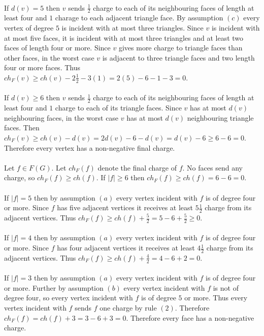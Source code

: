 \documentclass[letterpaper,12pt,oneside,onecolumn]{report}
\begin{document}
\paragraph{}
If $d(v) = 5$ then $v$ sends $\frac{1}{2}$ charge to each of its neighbouring faces of length at least four and $1$ charage to each adjacent triangle face. By assumption $(c)$ every vertex of degree $5$ is incident with at most three triangles. Since $v$ is incident with at most five faces, it is incident with at most three triangles and at least two faces of length four or more. Since $v$ gives more charge to triangle faces than other faces, in the worst case $v$ is adjacent to three triangle faces and two length four or more faces. Thus $ch_F(v) \geq ch(v) - 2\frac{1}{2} - 3(1) = 2(5) - 6 -1 - 3 = 0$.
\paragraph{}
If $d(v) \geq 6$ then $v$ sends $\frac{1}{2}$ charge to each of its neighbouring faces of length at least four and $1$ charge to each of its triangle faces. Since $v$ has at most $d(v)$ neighbouring faces, in the worst case $v$ has at most $d(v)$ neighbouring triangle faces. Then $ch_F(v) \geq ch(v) - d(v) = 2d(v) - 6 - d(v) = d(v) - 6 \geq 6 - 6 = 0$. Therefore every vertex has a non-negative final charge.
\paragraph{}
Let $f \in F(G)$. Let $ch_F(f)$ denote the final charge of $f$. No faces send any charge, so $ch_F(f) \geq ch(f)$. If $|f| \geq 6$ then $ch_F(f) \geq ch(f) = 6 -6 =0$.
\paragraph{}
If $|f| = 5$ then by assumption $(a)$ every vertex incident with $f$ is of degree four or more. Since $f$ has five adjacent vertices it receives at least $5\frac{1}{2}$ charge from its adjacent vertices. Thus $ch_F(f) \geq ch(f) + \frac{5}{2} = 5 - 6 + \frac{5}{2} \geq 0$.
\paragraph{}
If $|f| = 4$ then by assumption $(a)$ every vertex incident with $f$ is of degree four or more. Since $f$ has four adjacent vertices it receives at least $4\frac{1}{2}$ charge from its adjacent vertices. Thus $ch_F(f) \geq ch(f) + \frac{4}{2} = 4 - 6 + 2 = 0$.  
\paragraph{}
If $|f| = 3$ then by assumption $(a)$ every vertex incident with $f$ is of degree four or more. Further by assumption $(b)$ every vertex incident with $f$ is not of degree four, so every vertex incident with $f$ is of degree $5$ or more. Thus every vertex incident with $f$ sends $f$ one charge by rule $(2)$. Therefore $ch_F(f) = ch(f) + 3 = 3 - 6 + 3 = 0$. Therefore every face has a non-negative charge.
\end{document}
